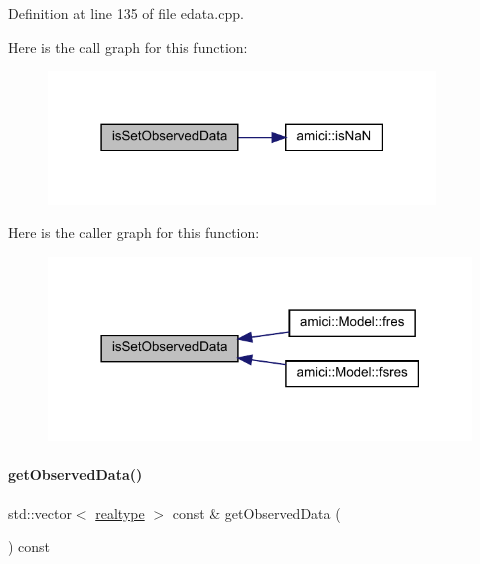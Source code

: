 Definition at line 135 of file edata.\+cpp.

Here is the call graph for this function\+:
\nopagebreak
\begin{figure}[H]
\begin{center}
\leavevmode
\includegraphics[width=291pt]{classamici_1_1_exp_data_aedcda756b6356d6e147f2f4eb7658500_cgraph}
\end{center}
\end{figure}
Here is the caller graph for this function\+:
\nopagebreak
\begin{figure}[H]
\begin{center}
\leavevmode
\includegraphics[width=318pt]{classamici_1_1_exp_data_aedcda756b6356d6e147f2f4eb7658500_icgraph}
\end{center}
\end{figure}
\mbox{\label{classamici_1_1_exp_data_a509b3b8f38e8529dd59c1415dc6b839c}} 
\paragraph{\texorpdfstring{get\+Observed\+Data()}{getObservedData()}}
{\footnotesize\ttfamily std\+::vector$<$ \mbox{\hyperlink{namespaceamici_a1bdce28051d6a53868f7ccbf5f2c14a3}{realtype}} $>$ const  \& get\+Observed\+Data (\begin{DoxyParamCaption}{ }\end{DoxyParamCaption}) const}

